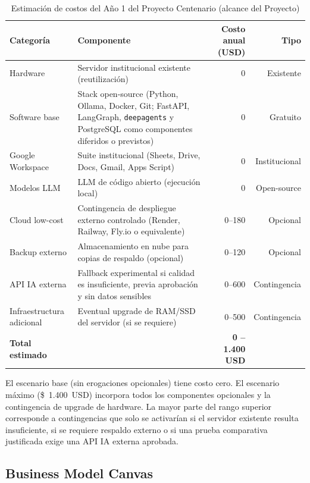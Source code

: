 \documentclass[a4paper, 12pt]{article}
\renewcommand{\arraystretch}{1.18}
\begin{document}
\begin{table}[H]
  \centering
  \caption{Estimaci\'on de costos del A\~no 1 del Proyecto Centenario (alcance del Proyecto)}
  \label{tab:costos}
  \footnotesize
  \renewcommand{\arraystretch}{1.05}
  \begin{tabularx}{\textwidth}{l>{\raggedright\arraybackslash}Xrr}
    \toprule
    \textbf{Categor\'ia} & \textbf{Componente} & \textbf{Costo anual (USD)} & \textbf{Tipo} \\
    \midrule
    Hardware        & Servidor institucional existente (reutilizaci\'on) & 0 & Existente \\
    Software base   & Stack open-source (Python, Ollama, Docker, Git; FastAPI, LangGraph, \texttt{deepagents} y PostgreSQL como componentes diferidos o previstos) & 0 & Gratuito \\
    Google Workspace & Suite institucional (Sheets, Drive, Docs, Gmail, Apps Script) & 0 & Institucional \\
    Modelos LLM     & LLM de c\'odigo abierto (ejecuci\'on local) & 0 & Open-source \\
    Cloud low-cost  & Contingencia de despliegue externo controlado (Render, Railway, Fly.io o equivalente) & 0--180 & Opcional \\
    Backup externo  & Almacenamiento en nube para copias de respaldo (opcional) & 0--120 & Opcional \\
    API IA externa  & Fallback experimental si calidad es insuficiente, previa aprobaci\'on y sin datos sensibles & 0--600 & Contingencia \\
    Infraestructura adicional & Eventual upgrade de RAM/SSD del servidor (si se requiere) & 0--500 & Contingencia \\
    \midrule
    \textbf{Total estimado} & & \textbf{0 -- 1.400 USD} & \\
    \bottomrule
  \end{tabularx}
\end{table}

El escenario base (sin erogaciones opcionales) tiene costo cero. El escenario m\'aximo (\$~1.400~USD) incorpora todos los componentes opcionales y la contingencia de upgrade de hardware. La mayor parte del rango superior corresponde a contingencias que solo se activar\'ian si el servidor existente resulta insuficiente, si se requiere respaldo externo o si una prueba comparativa justificada exige una API IA externa aprobada.

\subsection{Business Model Canvas}
\end{document}
